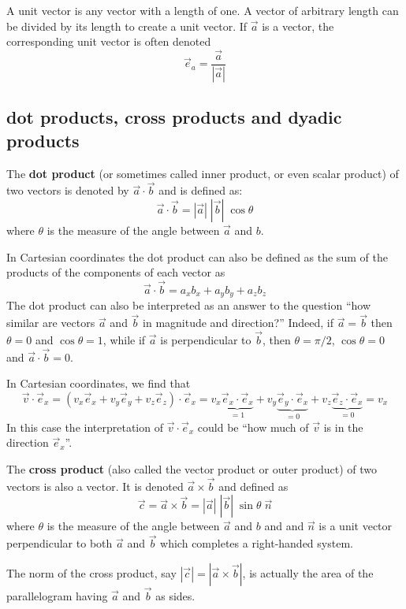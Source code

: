 A unit vector is any vector with a length of one. 
A vector of arbitrary length can be divided by its length to create a unit vector.
If $\vec{a}$ is a vector, the corresponding unit vector is often denoted
\[
\vec{e}_a = \frac{\vec{a}}{|\vec{a}|}
\]


\subsection{dot products, cross products and dyadic products}

The {\bf dot product} (or sometimes called inner product, or even scalar product) of two vectors is denoted by 
$\vec{a}\cdot \vec{b}$ and is defined as:
\[
\vec{a}\cdot \vec{b} = |\vec{a}| \; |\vec{b}| \; \cos\theta
\]
where $\theta$  is the measure of the angle between $\vec{a}$ and ${b}$.


In Cartesian coordinates the dot product can also be defined as the sum 
of the products of the components of each vector as
\[
\vec{a}\cdot\vec{b} = a_xb_x + a_yb_y + a_zb_z  
\]
The dot product can also be interpreted as an answer to the question ``how similar are vectors $\vec{a}$
and $\vec{b}$ in magnitude and direction?'' Indeed, if $\vec{a}=\vec{b}$ then $\theta=0$ and $\cos\theta=1$, while if 
$\vec{a}$ is perpendicular to $\vec{b}$, then $\theta=\pi/2$, $\cos\theta=0$ and $\vec{a}\cdot \vec{b}=0$. 

In Cartesian coordinates, we find that 
\[
\vec{v} \cdot \vec{e}_x 
= (v_x \vec{e}_x + v_y \vec{e}_y + v_z \vec{e}_z ) \cdot \vec{e}_x
= v_x \underbrace{\vec{e}_x \cdot \vec{e}_x}_{=1}
+ v_y \underbrace{\vec{e}_y \cdot \vec{e}_x}_{=0}
+ v_z \underbrace{\vec{e}_z \cdot \vec{e}_x}_{=0} 
=v_x
\]
In this case the interpretation of $\vec{v} \cdot \vec{e}_x$ could be ``how much of $\vec{v}$
is in the direction $\vec{e}_x$''.

The {\bf cross product} (also  called the vector product or outer product) of two vectors is also a vector.
It is denoted $\vec{a} \times \vec{b}$ and defined as 
\[
\vec{c} = \vec{a} \times \vec{b} = |\vec{a}| \; |\vec{b}|\; \sin\theta \; \vec{n}
\]
where $\theta$  is the measure of the angle between $\vec{a}$ and ${b}$ and
and $\vec{n}$ is a unit vector perpendicular to both $\vec{a}$ and $\vec{b}$ 
which completes a right-handed system.


The norm of the cross product, say $|\vec{c}|=|\vec{a} \times \vec{b}|$, is actually the 
area of the parallelogram having $\vec{a}$ and $\vec{b}$ as sides.

